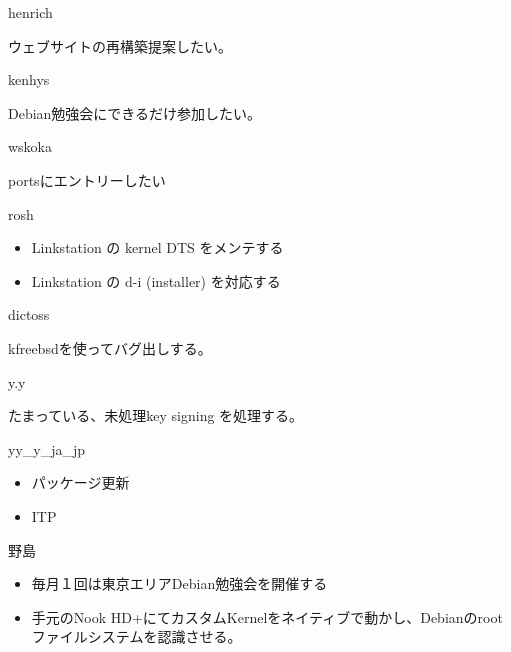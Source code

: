 \begin{frame}{henrich}

 ウェブサイトの再構築提案したい。

\end{frame}

\begin{frame}{kenhys}

 Debian勉強会にできるだけ参加したい。

\end{frame}

\begin{frame}{wskoka}

 portsにエントリーしたい

\end{frame}

\begin{frame}{rosh}

\begin{itemize}
\item Linkstation の kernel DTS をメンテする
\item Linkstation の d-i (installer) を対応する
\end{itemize}

\end{frame}

\begin{frame}{dictoss}

kfreebsdを使ってバグ出しする。
  
\end{frame}

\begin{frame}{y.y}

 たまっている、未処理key signing を処理する。
  
\end{frame}

\begin{frame}{yy\_y\_ja\_jp}

\begin{itemize}
\item パッケージ更新
\item ITP
\end{itemize}
  
\end{frame}

\begin{frame}{野島}

\begin{itemize}
\item 毎月１回は東京エリアDebian勉強会を開催する
\item 手元のNook HD+にてカスタムKernelをネイティブで動かし、Debianのrootファイルシステムを認識させる。
\end{itemize}
  
\end{frame}

